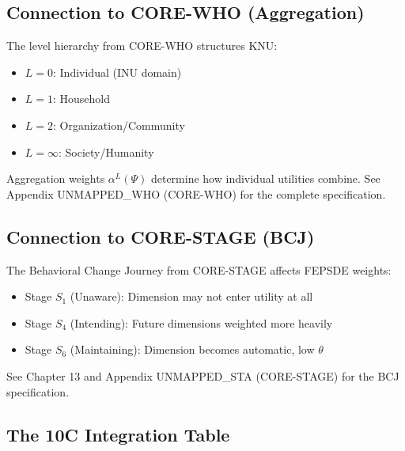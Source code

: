 \subsection{Connection to CORE-WHO (Aggregation)}
\label{sec:fepsde-levels}

\begin{cross-reference}
The level hierarchy from CORE-WHO structures KNU:
\begin{itemize}[nosep]
  \item $L=0$: Individual (INU domain)
  \item $L=1$: Household
  \item $L=2$: Organization/Community
  \item $L=\infty$: Society/Humanity
\end{itemize}
Aggregation weights $\alpha^L(\Psi)$ determine how individual utilities combine.
See Appendix UNMAPPED_WHO (CORE-WHO) for the complete specification.
\end{cross-reference}

\subsection{Connection to CORE-STAGE (BCJ)}
\label{sec:fepsde-bcj}

\begin{cross-reference}
The Behavioral Change Journey from CORE-STAGE affects FEPSDE weights:
\begin{itemize}[nosep]
  \item Stage $S_1$ (Unaware): Dimension may not enter utility at all
  \item Stage $S_4$ (Intending): Future dimensions weighted more heavily
  \item Stage $S_6$ (Maintaining): Dimension becomes automatic, low $\theta$
\end{itemize}
See Chapter 13 and Appendix UNMAPPED_STA (CORE-STAGE) for the BCJ specification.
\end{cross-reference}

\subsection{The 10C Integration Table}

